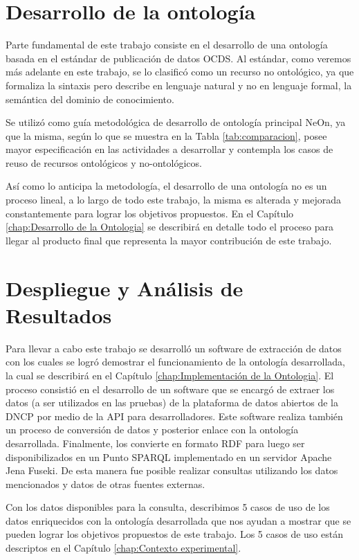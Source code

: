 \section{Desarrollo de la ontología}
\label{section:desarrolloOntologia}

Parte fundamental de este trabajo consiste en el desarrollo de una ontología basada en el estándar de publicación de datos OCDS. Al estándar, como veremos más adelante en este trabajo, se lo clasificó como un recurso no ontológico, ya que formaliza la sintaxis pero describe en lenguaje natural y no en lenguaje formal, la semántica del dominio de conocimiento. 

Se utilizó como guía metodológica de desarrollo de ontología principal NeOn, ya que la misma, según lo que se muestra en la Tabla  \ref{tab:comparacion}, posee mayor especificación en las actividades a desarrollar  y contempla los casos de reuso de recursos ontológicos y no-ontológicos. 

Así como lo anticipa la metodología, el desarrollo de una ontología no es un proceso lineal, a lo largo de todo este trabajo, la misma es alterada y mejorada constantemente para lograr los objetivos propuestos. En el Capítulo \ref{chap:Desarrollo de la Ontologia} se describirá en detalle todo el proceso para llegar al producto final que representa la mayor contribución de este trabajo.

\section{Despliegue y Análisis de Resultados}
\label{section:despliegue}

Para llevar a cabo este trabajo se desarrolló un software de extracción de datos con los cuales se logró demostrar el funcionamiento de la ontología desarrollada, la cual se describirá en el Capítulo \ref{chap:Implementación de la Ontologia}. El proceso consistió en el desarrollo de un software que se encargó de extraer los datos (a ser utilizados en las pruebas) de la plataforma de datos abiertos de la DNCP por medio de la API para desarrolladores. Este software realiza también un proceso de conversión de datos y posterior enlace con la ontología desarrollada. Finalmente, los convierte en formato RDF para luego ser disponibilizados en un Punto SPARQL implementado en un servidor Apache Jena Fuseki. De esta manera fue posible realizar consultas utilizando los datos mencionados y datos de otras fuentes externas.

Con los datos disponibles para la consulta, describimos 5 casos de uso de los datos enriquecidos con la ontología desarrollada que nos ayudan a mostrar que se pueden lograr los objetivos propuestos de este trabajo. Los 5 casos de uso están descriptos en el Capítulo \ref{chap:Contexto experimental}.

